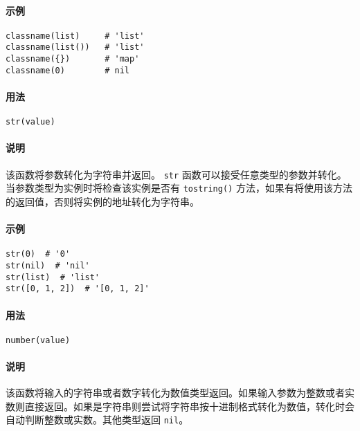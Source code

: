 \paragraph{示例}
\begin{lstlisting}[language=berry, numbers=none]
classname(list)     # 'list'
classname(list())   # 'list'
classname({})       # 'map'
classname(0)        # nil
\end{lstlisting}


\paragraph{用法}
\begin{lstlisting}[language=berry, numbers=none]
str(value)
\end{lstlisting}

\paragraph{说明}
该函数将参数转化为字符串并返回。 \texttt{str} 函数可以接受任意类型的参数并转化。当参数类型为实例时将检查该实例是否有 \texttt{tostring()} 方法，如果有将使用该方法的返回值，否则将实例的地址转化为字符串。

\paragraph{示例}
\begin{lstlisting}[language=berry, numbers=none]
str(0)  # '0'
str(nil)  # 'nil'
str(list)  # 'list'
str([0, 1, 2])  # '[0, 1, 2]'
\end{lstlisting}


\paragraph{用法}
\begin{lstlisting}[language=berry, numbers=none]
number(value)
\end{lstlisting}

\paragraph{说明}
该函数将输入的字符串或者数字转化为数值类型返回。如果输入参数为整数或者实数则直接返回。如果是字符串则尝试将字符串按十进制格式转化为数值，转化时会自动判断整数或实数。其他类型返回 \texttt{nil}。

